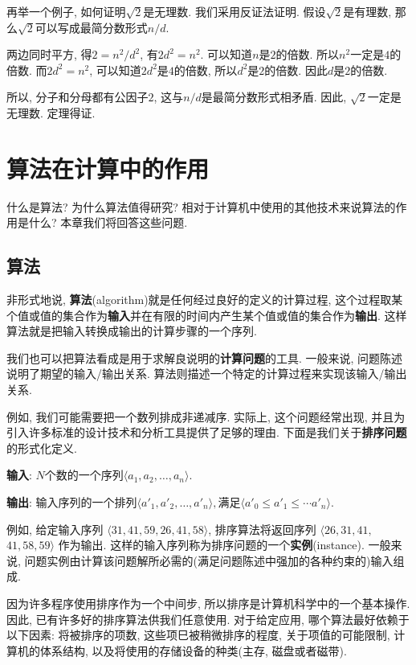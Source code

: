 \documentclass[oneside,10pt,fontset=none]{ctexbook}
\numberwithin{definition}{chapter}
\numberwithin{theorem}{chapter}
\numberwithin{proof}{chapter}
\begin{document}
再举一个例子, 如何证明$\sqrt{2}$是无理数. 我们采用反证法证明. 假设$\sqrt{2}$是有理数, 那么$\sqrt{2}$可以写成最简分数形式$n/d$.

两边同时平方, 得$2=n^2/d^2$, 有$2d^2=n^2$. 可以知道$n$是$2$的倍数. 所以$n^2$一定是$4$的倍数. 而$2d^2=n^2$, 可以知道$2d^2$是$4$的倍数, 所以$d^2$是$2$的倍数. 因此$d$是$2$的倍数.

所以, 分子和分母都有公因子$2$, 这与$n/d$是最简分数形式相矛盾. 因此, $\sqrt{2}$一定是无理数. 定理得证.

\chapter{算法在计算中的作用}

什么是算法? 为什么算法值得研究? 相对于计算机中使用的其他技术来说算法的作用是什么? 本章我们将回答这些问题.

\section{算法}

非形式地说, \textbf{算法}(algorithm)就是任何经过良好的定义的计算过程, 这个过程取某个值或值的集合作为\textbf{输入}并在有限的时间内产生某个值或值的集合作为\textbf{输出}. 这样算法就是把输入转换成输出的计算步骤的一个序列.

我们也可以把算法看成是用于求解良说明的\textbf{计算问题}的工具. 一般来说, 问题陈述说明了期望的输入/输出关系. 算法则描述一个特定的计算过程来实现该输入/输出关系.

例如, 我们可能需要把一个数列排成非递减序. 实际上, 这个问题经常出现, 并且为引入许多标准的设计技术和分析工具提供了足够的理由. 下面是我们关于\textbf{排序问题}的形式化定义.

\textbf{输入}: $N$个数的一个序列$\langle a_1, a_2, \dots, a_n\rangle$.

\textbf{输出}: 输入序列的一个排列$\langle a'_1, a'_2, \dots, a'_n\rangle , \text{满足}\langle a'_0\leq a'_1 \leq\cdots a'_n\rangle$.

例如, 给定输入序列 $\langle 31, 41, 59, 26, 41, 58\rangle$, 排序算法将返回序列 $\langle 26, 31, 41,$ $ 41, 58, 59\rangle$ 作为输出. 这样的输入序列称为排序问题的一个\textbf{实例}(instance). 一般来说, 问题实例由计算该问题解所必需的(满足问题陈述中强加的各种约束的)输入组成.

因为许多程序使用排序作为一个中间步, 所以排序是计算机科学中的一个基本操作. 因此, 已有许多好的排序算法供我们任意使用. 对于给定应用, 哪个算法最好依赖于以下因素: 将被排序的项数, 这些项巳被稍微排序的程度, 关于项值的可能限制, 计算机的体系结构, 以及将使用的存储设备的种类(主存, 磁盘或者磁带).
\end{document}
